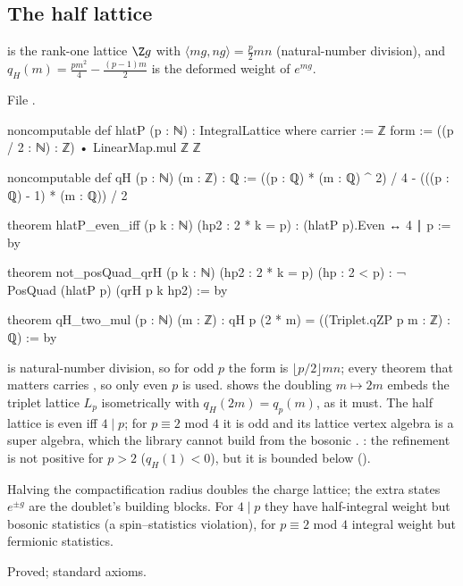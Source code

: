 \subsection{The half lattice}

\begin{definition}\label{l18:def:hlat}
 is the rank-one lattice $\Z g$ with $\langle mg,ng\rangle=\frac p2mn$ (natural-number division), and
$q_H(m)=\frac{pm^2}4-\frac{(p-1)m}2$ is the deformed weight of $e^{mg}$.
\end{definition}
\noindent File .
\begin{leancode}
noncomputable def hlatP (p : ℕ) : IntegralLattice where
  carrier := ℤ
  form := ((p / 2 : ℕ) : ℤ) • LinearMap.mul ℤ ℤ

noncomputable def qH (p : ℕ) (m : ℤ) : ℚ :=
  ((p : ℚ) * (m : ℚ) ^ 2) / 4 - (((p : ℚ) - 1) * (m : ℚ)) / 2

theorem hlatP_even_iff (p k : ℕ) (hp2 : 2 * k = p) : (hlatP p).Even ↔ 4 ∣ p := by

theorem not_posQuad_qrH (p k : ℕ) (hp2 : 2 * k = p) (hp : 2 < p) :
    ¬ PosQuad (hlatP p) (qrH p k hp2) := by

theorem qH_two_mul (p : ℕ) (m : ℤ) : qH p (2 * m) = ((Triplet.qZP p m : ℤ) : ℚ) := by
\end{leancode}
\begin{dictionary}
 is natural-number division, so for odd $p$ the form is $\lfloor p/2\rfloor mn$; every theorem that matters
carries , so only even $p$ is used.  shows the doubling $m\mapsto2m$ embeds the
triplet lattice $L_p$ isometrically with $q_H(2m)=q_p(m)$, as it must. The half lattice is even iff $4\mid p$; for $p\equiv2$
mod $4$ it is odd and its lattice vertex algebra is a super algebra, which the library cannot build from the bosonic
. : the refinement is not positive for $p>2$ ($q_H(1)<0$), but it is bounded below
().
\end{dictionary}
\begin{physics}
Halving the compactification radius doubles the charge lattice; the extra states $e^{\pm g}$ are the doublet's
building blocks. For $4\mid p$ they have half-integral weight but bosonic statistics (a spin--statistics
violation), for $p\equiv2$ mod $4$ integral weight but fermionic statistics.
\end{physics}
\begin{status}
Proved; standard axioms.
\end{status}

